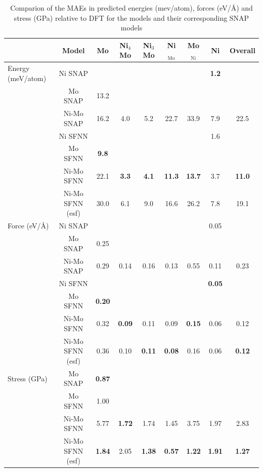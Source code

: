 \documentclass[prb,preprint]{revtex4-2}
\begin{document}
\begin{table}[h]
\centering
\begin{tabular}{lcccccccc}
\hline
    & Model & Mo & Ni$_4$Mo & Ni$_3$Mo & Ni$_{\mathrm{Mo}}$ & Mo$_{\mathrm{Ni}}$ 
    & Ni & Overall \\
\hline
Energy (meV/atom) & Ni SNAP & & & & & & \textbf{1.2} & \\
    & Mo SNAP & 13.2 & & & & & & \\
    & Ni-Mo SNAP & 16.2 & 4.0 & 5.2 & 22.7 & 33.9 & 7.9 & 22.5 \\
    & Ni SFNN & & & & & & 1.6 & \\
    & Mo SFNN & \textbf{9.8} & & & & & & \\
    & Ni-Mo SFNN & 22.1 & \textbf{3.3} & \textbf{4.1} & \textbf{11.3} 
    & \textbf{13.7} & 3.7 & \textbf{11.0} \\
    & Ni-Mo SFNN (esf) & 30.0 & 6.1 & 9.0 & 16.6 
    & 26.2 & 7.8 & 19.1 \\
\hline
Force (eV/\AA) & Ni SNAP & & & & & & 0.05 & \\
& Mo SNAP & 0.25 & & & & & & \\
& Ni-Mo SNAP & 0.29 & 0.14 & 0.16 & 0.13 & 0.55 & 0.11 & 0.23 \\
& Ni SFNN & & & & & & \textbf{0.05} & \\
& Mo SFNN & \textbf{0.20} & & & & & & \\
& Ni-Mo SFNN & 0.32 & \textbf{0.09} & 0.11 & 0.09 & 
    \textbf{0.15} & 0.06 & 0.12 \\
& Ni-Mo SFNN (esf) & 0.36 & 0.10 & \textbf{0.11} & \textbf{0.08} & 
    0.16 & 0.06 & \textbf{0.12} \\
\hline
Stress (GPa) & Mo SNAP & \textbf{0.87} & & & & & & \\
& Mo SFNN & 1.00 & & & & & & \\
& Ni-Mo SFNN & 5.77 & \textbf{1.72} & 1.74 & 1.45 & 3.75 & 1.97 & 2.83 \\
& Ni-Mo SFNN (esf) & \textbf{1.84} & 2.05 & \textbf{1.38} & \textbf{0.57} & 
    \textbf{1.22} & \textbf{1.91} & \textbf{1.27} \\
\hline
\end{tabular}
\caption{\label{table:MAE}
Comparion of the MAEs in predicted energies (mev/atom), forces (eV/\AA) and 
stress (GPa) relative to DFT for the \tensoralloy{} models and their 
corresponding SNAP models}
\end{table}
\end{document}
